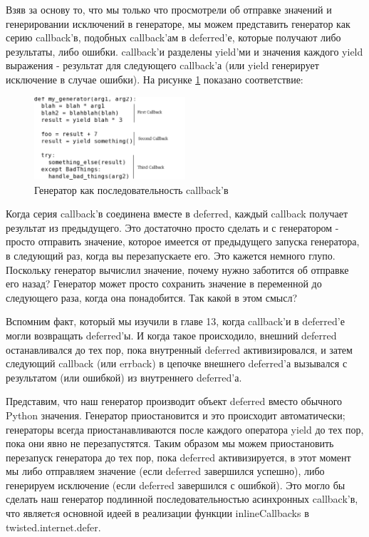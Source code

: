 Взяв за основу то, что мы только что просмотрели об отправке значений и 
генерировании исключений в генераторе, мы можем представить генератор 
как серию callback'в, подобных callback'ам в deferred'е, которые 
получают либо результаты, либо ошибки. callback'и разделены 
yield'ми и значения каждого yield выражения - результат для следующего 
callback'а (или yield генерирует исключение в случае ошибки). 
На рисунке \ref{fig:generator-callbacks1} показано соответствие:
 
\begin{figure}[h]
\begin{center}
    \includegraphics[width=0.5\textwidth]{images/generator-callbacks1.pdf}
    \caption{Генератор как последовательность callback'в\label{fig:generator-callbacks1}}
\end{center}
\end{figure}


Когда серия callback'в соединена вместе в deferred, 
каждый callback получает результат из предыдущего. Это достаточно 
просто сделать и с генератором - просто отправить значение, которое 
имеется от предыдущего запуска генератора, в следующий раз, когда 
вы перезапускаете его. Это кажется немного глупо. Поскольку генератор 
вычислил значение, почему нужно заботится об отправке его назад? 
Генератор может просто сохранить значение в переменной до 
следующего раза, когда она понадобится. Так какой в этом смысл?


Вспомним факт, который мы изучили в главе 13, когда 
callback'и в deferred'е могли возвращать deferred'ы. 
И когда такое происходило, внешний deferred останавливался до тех 
пор, пока внутренный deferred активизировался, и затем 
следующий callback (или errback) в цепочке внешнего deferred'а 
вызывался с результатом (или ошибкой) из внутреннего deferred'а.


Представим, что наш генератор производит объект deferred вместо 
обычного Python значения. Генератор приостановится и это происходит 
автоматически; генераторы всегда приостанавливаются после каждого 
оператора yield до тех пор, пока они явно не перезапустятся. 
Таким образом мы можем приостановить перезапуск генератора до тех пор, 
пока deferred активизируется, в этот момент мы либо отправляем значение 
(если deferred завершился успешно), либо генерируем исключение (если 
deferred завершился с ошибкой). Это могло бы сделать наш генератор 
подлинной последовательностью асинхронных callback'в, что  
являетcя основной идеей в реализации функции inlineCallbacks в twisted.internet.defer. 


